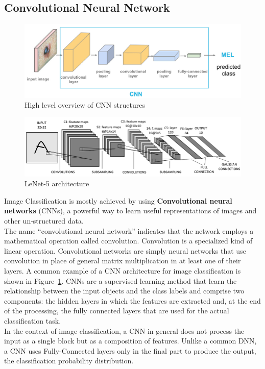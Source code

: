 \subsection{Convolutional Neural Network}
\begin{figure}[]
    \centering
        \includegraphics[width=0.9\linewidth]{images/CNN_ex.jpg}
    \caption{High level overview of CNN structures}
    \label{fig:CNN}
\end{figure}
\begin{figure}[hb]
    \centering
        \includegraphics[width=0.7\linewidth]{images/deepLearning/leNet.png}
    \caption{LeNet-5 architecture \cite{LeNet} }
    
    \label{fig:LeNet}
\end{figure}
Image Classification is mostly achieved by using \textbf{Convolutional neural networks} (CNNs), a powerful way to learn useful representations of images and other un-structured data.\\
The name “convolutional neural network” indicates that the network employs a mathematical operation called convolution. Convolution is a specialized kind of linear operation. Convolutional networks are simply neural networks that use convolution in place of general matrix multiplication in at least one of their layers\cite{goodfellow}. A common example of a CNN architecture for image classification is shown in Figure~\ref{fig:CNN}. CNNs are a supervised learning method that learn the relationship between the input objects and the class labels and comprise two components: the hidden layers in which the features are extracted and, at the end of the processing, the fully connected layers that are used for the actual classification task. \\
In the context of image classification, a CNN in general does not process the input as a single block but as a composition of features. Unlike a common DNN, a CNN uses Fully-Connected layers only in the final part to produce the output, the classification probability distribution. 
